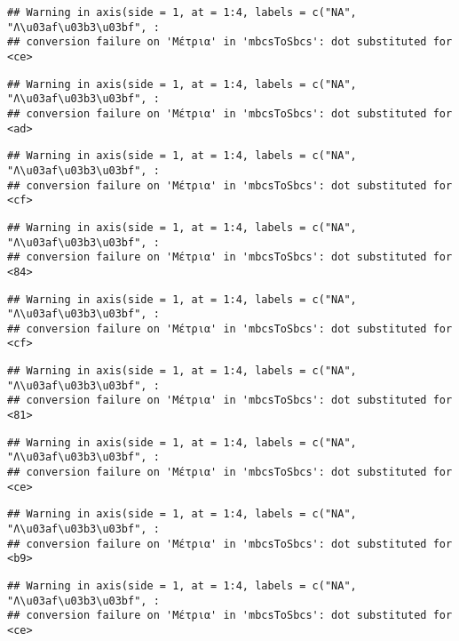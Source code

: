 \documentclass[
]{article}
\begin{document}
\begin{verbatim}
## Warning in axis(side = 1, at = 1:4, labels = c("NA", "Λ\u03af\u03b3\u03bf", :
## conversion failure on 'Μέτρια' in 'mbcsToSbcs': dot substituted for <ce>
\end{verbatim}

\begin{verbatim}
## Warning in axis(side = 1, at = 1:4, labels = c("NA", "Λ\u03af\u03b3\u03bf", :
## conversion failure on 'Μέτρια' in 'mbcsToSbcs': dot substituted for <ad>
\end{verbatim}

\begin{verbatim}
## Warning in axis(side = 1, at = 1:4, labels = c("NA", "Λ\u03af\u03b3\u03bf", :
## conversion failure on 'Μέτρια' in 'mbcsToSbcs': dot substituted for <cf>
\end{verbatim}

\begin{verbatim}
## Warning in axis(side = 1, at = 1:4, labels = c("NA", "Λ\u03af\u03b3\u03bf", :
## conversion failure on 'Μέτρια' in 'mbcsToSbcs': dot substituted for <84>
\end{verbatim}

\begin{verbatim}
## Warning in axis(side = 1, at = 1:4, labels = c("NA", "Λ\u03af\u03b3\u03bf", :
## conversion failure on 'Μέτρια' in 'mbcsToSbcs': dot substituted for <cf>
\end{verbatim}

\begin{verbatim}
## Warning in axis(side = 1, at = 1:4, labels = c("NA", "Λ\u03af\u03b3\u03bf", :
## conversion failure on 'Μέτρια' in 'mbcsToSbcs': dot substituted for <81>
\end{verbatim}

\begin{verbatim}
## Warning in axis(side = 1, at = 1:4, labels = c("NA", "Λ\u03af\u03b3\u03bf", :
## conversion failure on 'Μέτρια' in 'mbcsToSbcs': dot substituted for <ce>
\end{verbatim}

\begin{verbatim}
## Warning in axis(side = 1, at = 1:4, labels = c("NA", "Λ\u03af\u03b3\u03bf", :
## conversion failure on 'Μέτρια' in 'mbcsToSbcs': dot substituted for <b9>
\end{verbatim}

\begin{verbatim}
## Warning in axis(side = 1, at = 1:4, labels = c("NA", "Λ\u03af\u03b3\u03bf", :
## conversion failure on 'Μέτρια' in 'mbcsToSbcs': dot substituted for <ce>
\end{verbatim}
\end{document}
